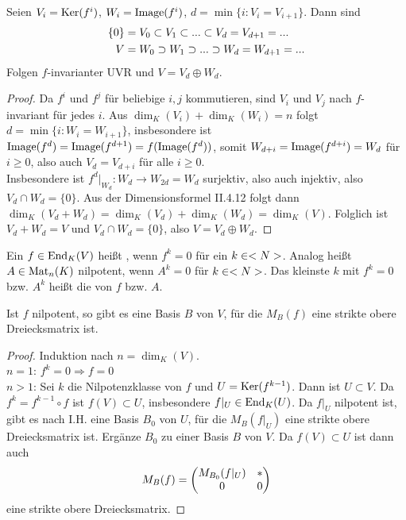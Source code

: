 \begin{proposition}
	Seien $V_i=\operatorname{Ker}(f^i)$, $W_i=\operatorname{Image}(f^i)$, $d=\min\{i:V_i=V_{i+1}\}$. Dann sind 
	\begin{align}
		\{0\}&=V_0\subset V_1\subset ...\subset V_d=V_{d+1}=...\notag \\
		V&= W_0\supset W_1\supset ... \supset W_d=W_{d+1}=...\notag
	\end{align}
	Folgen $f$-invarianter UVR und $V=V_d\oplus W_d$.
\end{proposition}
\begin{proof}
	Da $f^i$ und $f^j$ für beliebige $i,j$ kommutieren, sind $V_i$ und $V_j$ nach  $f$-invariant für jedes $i$. Aus $\dim_K(V_i)+\dim_K(W_i)=n$ folgt $d=\min\{i:W_i=W_{i+1}\}$, insbesondere ist $\operatorname{Image}(f^d)=\operatorname{Image}(f^{d+1})=f(\operatorname{Image}(f^d))$, somit $W_{d+i}=\operatorname{Image}(f^{d+i})=W_d$ für $i\ge 0$, also auch $V_d=V_{d+i}$ für alle $i\ge 0$. \\
	Insbesondere ist $f^d\vert_{W_d}:W_d\to W_{2d}=W_d$ surjektiv, also auch injektiv, also $V_d\cap W_d=\{0\}$. Aus der Dimensionsformel II.4.12 folgt dann $\dim_K(V_d+W_d)=\dim_K(V_d)+\dim_K(W_d)=\dim_K(V)$. Folglich ist $V_d+W_d=V$ und $V_d\cap W_d=\{0\}$, also $V=V_d\oplus W_d$.
\end{proof}

\begin{definition}[nilpotent]
	Ein $f\in\operatorname{End}_K(V)$ heißt , wenn $f^k=0$ für ein $k\in<N>$. Analog heißt $A\in\operatorname{Mat}_n(K)$ nilpotent, wenn $A^k=0$ für $k\in<N>$. Das kleinste $k$ mit $f^k=0$ bzw. $A^k$ heißt die  von $f$ bzw. $A$.
\end{definition}

\begin{lemma}
	Ist $f$ nilpotent, so gibt es eine Basis $B$ von $V$, für die $M_B(f)$ eine strikte obere Dreiecksmatrix ist.
\end{lemma}
\begin{proof}
	Induktion nach $n=\dim_K(V)$. \\
	\emph{$n=1$}: $f^k=0\Rightarrow f=0$ \\
	\emph{$n>1$}: Sei $k$ die Nilpotenzklasse von $f$ und $U=\operatorname{Ker}(f^{k-1})$. Dann ist $U\subset V$. Da $f^k=f^{k-1}\circ f$ ist $f(V)\subset U$, insbesondere $f\vert_U\in\operatorname{End}_K(U)$. Da $f\vert_U$ nilpotent ist, gibt es nach I.H. eine Basis $B_0$ von $U$, für die $M_B(f\vert_U)$ eine strikte obere Dreiecksmatrix ist. Ergänze $B_0$ zu einer Basis $B$ von $V$. Da $f(V)\subset U$ ist dann auch 
	\begin{align}
		M_B(f)=\begin{pmatrix}M_{B_0}(f\vert_U)&*\\0&0\end{pmatrix}\notag
	\end{align}
	eine strikte obere Dreiecksmatrix.
\end{proof}

